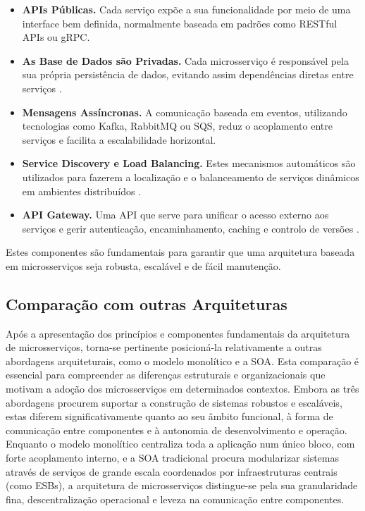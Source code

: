 \begin{itemize}
    \item \textbf{APIs Públicas.} Cada serviço expõe a sua funcionalidade por meio de uma interface bem definida, normalmente baseada em padrões como RESTful APIs ou gRPC.

    \item \textbf{As Base de Dados são Privadas.} Cada microsserviço é responsável pela sua própria persistência de dados, evitando assim dependências diretas entre serviços \cite{Dragoni2017}.

    \item \textbf{Mensagens Assíncronas.} A comunicação baseada em eventos, utilizando tecnologias como Kafka, RabbitMQ ou SQS, reduz o acoplamento entre serviços e facilita a escalabilidade horizontal.

    \item \textbf{Service Discovery e Load Balancing.} Estes mecanismos automáticos são utilizados para fazerem a localização e o balanceamento de serviços dinâmicos em ambientes distribuídos \cite{Newman2015}.

    \item \textbf{API Gateway.} Uma API que serve para unificar o acesso externo aos serviços e gerir autenticação, encaminhamento, caching e controlo de versões \cite{Richardson2018}.
\end{itemize}


Estes componentes são fundamentais para garantir que uma arquitetura baseada em microsserviços seja robusta, escalável e de fácil manutenção.

\subsection{Comparação com outras Arquiteturas}

Após a apresentação dos princípios e componentes fundamentais da arquitetura de microsserviços, torna-se pertinente posicioná-la relativamente a outras abordagens arquiteturais, como o modelo monolítico e a SOA. Esta comparação é essencial para compreender as diferenças estruturais e organizacionais que motivam a adoção dos microsserviços em determinados contextos. Embora as três abordagens procurem suportar a construção de sistemas robustos e escaláveis, estas diferem significativamente quanto ao seu âmbito funcional, à forma de comunicação entre componentes e à autonomia de desenvolvimento e operação. Enquanto o modelo monolítico centraliza toda a aplicação num único bloco, com forte acoplamento interno, e a SOA tradicional procura modularizar sistemas através de serviços de grande escala coordenados por infraestruturas centrais (como ESBs), a arquitetura de microsserviços distingue-se pela sua granularidade fina, descentralização operacional e leveza na comunicação entre componentes.

